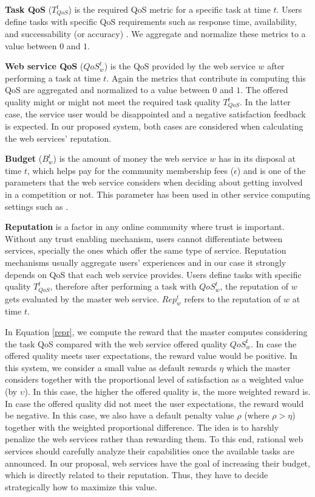 \documentclass[runningheads,a4paper]{llncs}
\begin{document}
\textbf{Task QoS} ($T_{QoS}^t$) is the required QoS metric for a
specific task at time $t$. Users define tasks with specific QoS
requirements such as response time, availability, and
successability (or accuracy) \cite{Erbin}. We aggregate and
normalize these metrics to a value between $0$
and $1$. %

\textbf{Web service QoS} ($QoS_w^t$) is the QoS provided by the
web service $w$ after performing a task at time $t$. Again the
metrics that contribute in computing this QoS are aggregated and
normalized to a value between $0$ and $1$. The offered quality
might or might not meet the required task quality $T_{QoS}^t$. In
the latter case, the service user would be disappointed and a
negative satisfaction feedback is expected. In our proposed
system, both cases are considered when calculating the web
services' reputation.


\textbf{Budget} ($B_w^t$) is the amount of money the web service
$w$ has in its disposal at time $t$, which helps pay for the
community membership fees ($\epsilon$) and is one of the
parameters that the web service considers when deciding about
getting involved in a competition or not. This parameter has been
used in other service computing settings such as \cite{Erbin}.

\textbf{Reputation} is a factor in any online community where
trust is important. Without any trust enabling mechanism, users
cannot differentiate between services, specially the ones which
offer the same type of service. Reputation mechanisms usually
aggregate users' experiences and in our case it strongly depends
on QoS that each web service provides. Users define tasks with
specific quality $T_{QoS}^t$, therefore after performing a task
with $QoS_w^t$, the reputation of $w$ gets evaluated by the master
web service. $Rep_{w}^{t}$ refers to the reputation of $w$ at time
$t$.

In Equation \ref{repr}, we compute the reward that the master
computes considering the task QoS compared with the web service
offered quality $QoS_w^t$. In case the offered quality meets user
expectations, the reward value would be positive. In this system,
we consider a small value as default rewards $\eta$ which the
master considers together with the proportional level of
satisfaction as a weighted value (by $\upsilon$). In this case,
the higher the offered quality is, the more weighted reward is. In
case the offered quality did not meet the user expectations, the
reward would be negative. In this case, we also have a default
penalty value $\rho$ (where $\rho>\eta$) together with the
weighted proportional difference. The idea is to harshly penalize
the web services rather than rewarding them. To this end, rational
web services should carefully analyze their capabilities once the
available tasks are announced. In our proposal, web services have
the goal of increasing their budget, which is directly related to
their reputation. Thus, they have to decide strategically how to
maximize this value.
\end{document}

